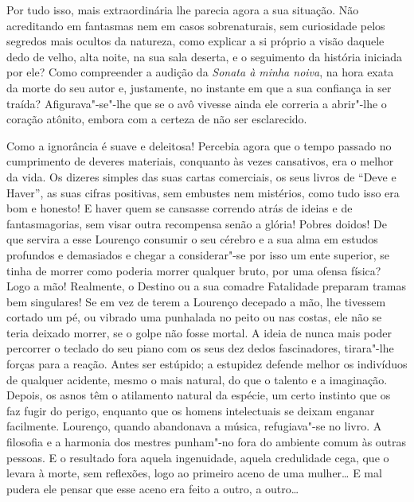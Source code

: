 Por tudo isso, mais extraordinária lhe parecia agora a sua situação. Não
acreditando em fantasmas nem em casos sobrenaturais, sem curiosidade
pelos segredos mais ocultos da natureza, como explicar a si próprio a
visão daquele dedo de velho, alta noite, na sua sala deserta, e o
seguimento da história iniciada por ele? Como compreender a audição da
\emph{Sonata à minha noiva}, na hora exata da morte do seu autor e,
justamente, no instante em que a sua confiança ia ser traída?
Afigurava"-se"-lhe que se o avô vivesse ainda ele correria a abrir"-lhe o
coração atônito, embora com a certeza de não ser esclarecido.

Como a ignorância é suave e deleitosa! Percebia agora que o tempo
passado no cumprimento de deveres materiais, conquanto às vezes
cansativos, era o melhor da vida. Os dizeres simples das suas cartas
comerciais, os seus livros de ``Deve e Haver'', as suas cifras
positivas, sem embustes nem mistérios, como tudo isso era bom e honesto!
E haver quem se cansasse correndo atrás de ideias e de fantasmagorias,
sem visar outra recompensa senão a glória! Pobres doidos! De que servira
a esse Lourenço consumir o seu cérebro e a sua alma em estudos profundos
e demasiados e chegar a considerar"-se por isso um ente superior, se
tinha de morrer como poderia morrer qualquer bruto, por uma ofensa
física? Logo a mão! Realmente, o Destino ou a sua comadre Fatalidade
preparam tramas bem singulares! Se em vez de terem a Lourenço decepado a
mão, lhe tivessem cortado um pé, ou vibrado uma punhalada no peito ou
nas costas, ele não se teria deixado morrer, se o golpe não fosse
mortal. A ideia de nunca mais poder percorrer o teclado do seu piano com
os seus dez dedos fascinadores, tirara"-lhe forças para a reação. Antes
ser estúpido; a estupidez defende melhor os indivíduos de qualquer
acidente, mesmo o mais natural, do que o talento e a imaginação. Depois,
os asnos têm o atilamento natural da espécie, um certo instinto que os
faz fugir do perigo, enquanto que os homens intelectuais se deixam
enganar facilmente. Lourenço, quando abandonava a música, refugiava"-se
no livro. A filosofia e a harmonia dos mestres punham"-no fora do
ambiente comum às outras
pessoas. E o resultado fora aquela ingenuidade, aquela credulidade cega,
que o levara à morte, sem reflexões, logo ao primeiro aceno de uma
mulher\ldots{} E mal pudera ele pensar que esse aceno era feito a outro, a
outro\ldots{}

